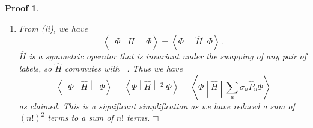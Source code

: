 \documentclass{article}
\theoremstyle{plain}\theoremheaderfont{\normalfont\itshape}\theorembodyfont{\rmfamily}\theoremseparator{.}\newtheorem*{rem}{Remark}\newtheorem*{ex}{Example}\newtheorem*{proof}{Proof}\newtheorem*{altp}{Alternative proof}
\theoremstyle{plain}\theoremheaderfont{\normalfont\bfseries}\theorembodyfont{\rmfamily}\theoremseparator{.}\newtheorem{thm}{Theorem}[section]\newtheorem{lem}[thm]{Lemma}\newtheorem{prop}[thm]{Proposition}\newtheorem*{cor}{Corollary}\newtheorem{defn}[thm]{Definition}\newtheorem{clm}[thm]{Claim}\newtheorem{clminproof}{Claim}
\theoremstyle{break}\theoremheaderfont{\normalfont\itshape}\theorembodyfont{\rmfamily}\theoremseparator{.\medskip}\newtheorem*{proofskip}{Proof}\newtheorem*{exs}{Examples}\newtheorem*{rems}{Remarks}
\theoremstyle{break}\theoremheaderfont{\normalfont\bfseries}\theorembodyfont{\rmfamily}\theoremseparator{.\medskip}\newtheorem{lemskip}[thm]{Lemma}\newtheorem{defnskip}[thm]{Definition}\newtheorem{propskip}[thm]{Proposition}\newtheorem{thmskip}[thm]{Theorem}
\numberwithin{equation}{section}
\newcommand{\qed}{\hfill\ensuremath{\Box}}
\newcommand{\braket}[2]{\left\langle #1 \middle| #2 \right\rangle}
\newcommand{\mel}[3]{\left\langle #1 \middle| #2 \middle| #3 \right\rangle}
\newcommand{\expval}[2]{\left\langle #2 \middle| #1 \middle| #2 \right\rangle}
\DeclareMathOperator{\antisymm}{\hat{\mathcal{A}}}
\begin{document}
\begin{proofskip}
\begin{enumerate}[topsep=0pt,label=(\roman*)]
            \begin{align}
                \braket{\hat{P}_u\Phi}{\Psi}&=\braket{\hat{P}_u^{-1}\hat{P}_u\Phi}{\hat{P}_u^{-1}\Psi}\notag\\
                &=\braket{\Phi}{\hat{P}_{u}^{-1}\Psi}
            \end{align}
            as acting the same permutation on both sides only introduces a relabelling of the integration variable. Note that \(\hat{P}_u\) and \(\hat{P}_{u}^{-1}\) have the same parity since parity \(\sigma:S_n\to C_2\) is a homomorphism and \(\sigma(\hat{P}_u^{-1})\sigma(\hat{P}_u)=\sigma(\hat{E})=1\). Therefore we have
            \begin{align}
                \braket{\sum_u\sigma_u\hat{P}_u\Phi}{\Psi}&=\braket{\Phi}{\sum_u\sigma_u\hat{P}_u^{-1}\Psi}\notag\\
                &=\braket{\Phi}{\sum_u\sigma_u\hat{P}_u\Psi}\,.
            \end{align}
            Hence
            \begin{equation}
                \braket{\antisymm\Phi}{\Psi}=\braket{\Phi}{\antisymm\Psi}\,.
            \end{equation}
            \item From (ii), we have
            \begin{equation}
                \expval{\hat{H}}{\antisymm\Phi}=\braket{\Phi}{\antisymm\hat{H}\antisymm\Phi}\,.
            \end{equation}
            \(\hat{H}\) is a symmetric operator that is invariant under the swapping of any pair of labels, so \(\hat{H}\) commutes with \(\antisymm\). Thus we have
            \begin{equation}
                \expval{\hat{H}}{\antisymm\Phi}=\mel{\Phi}{\hat{H}}{\antisymm^2\Phi}=\mel{\Phi}{\hat{H}}{\sum_u\sigma_u\hat{P}_u\Phi}
            \end{equation}
            as claimed. This is a significant simplification as we have reduced a sum of \((n!)^2\) terms to a sum of \(n!\) terms.\qed
        \end{enumerate}
    \end{proofskip}
\end{document}
